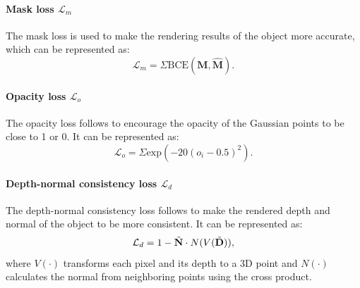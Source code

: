 \paragraph{Mask loss $\mathcal{L}_{m}$}\quad
The mask loss is used to make the rendering results of the object more accurate, which can be represented as:
\begin{equation}
    \mathcal{L}_{m} = \Sigma\text{BCE}(\textbf{M},\hat{\textbf{M}}).
\end{equation}

\paragraph{Opacity loss $\mathcal{L}_{o}$}\quad
The opacity loss follows \gs to encourage the opacity of the Gaussian points to be close to 1 or 0. It can be represented as:
\begin{equation}
    \mathcal{L}_{o} = \Sigma\text{exp}(-{20(o_i-0.5)}^2).
\end{equation}

\paragraph{Depth-normal consistency loss $\mathcal{L}_{d}$}\quad
The depth-normal consistency loss follows \gs to make the rendered depth and normal of the object to be more consistent.
It can be represented as:
\begin{equation}
    \mathcal{L}_{d} = 1-\Tilde{\textbf{N}}\cdot N(V(\Tilde{\textbf{D} })),
\end{equation}
where $V(\cdot)$ transforms each pixel and its depth to a 3D point and $N(\cdot)$ calculates the normal from neighboring points using the cross product.
